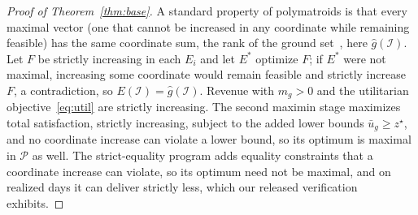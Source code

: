 \documentclass[manuscript, screen, review, anonymous]{acmart}
\begin{document}
\begin{proof}[Proof of Theorem~\ref{thm:base}]
A standard property of polymatroids is that every maximal vector (one that cannot be increased in any coordinate while remaining feasible) has the same coordinate sum, the rank of the ground set~\cite{fujishige2005submodular}, here $\hat g(\mathcal{I})$. Let $F$ be strictly increasing in each $E_i$ and let $E^*$ optimize $F$; if $E^*$ were not maximal, increasing some coordinate would remain feasible and strictly increase $F$, a contradiction, so $E(\mathcal{I})=\hat g(\mathcal{I})$. Revenue with $m_g>0$ and the utilitarian objective~\eqref{eq:util} are strictly increasing. The second maximin stage maximizes total satisfaction, strictly increasing, subject to the added lower bounds $\bar u_g\ge z^\star$, and no coordinate increase can violate a lower bound, so its optimum is maximal in $\mathcal{P}$ as well. The strict-equality program adds equality constraints that a coordinate increase can violate, so its optimum need not be maximal, and on realized days it can deliver strictly less, which our released verification exhibits.
\end{proof}
\end{document}
